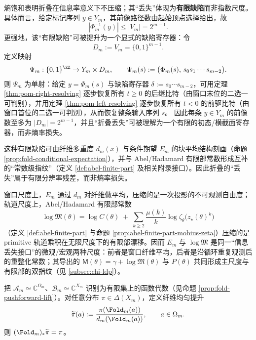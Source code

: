 \begin{remark}\label{rem:pom-finite-defect}
熵饱和表明折叠在信息率意义下不压缩；其“丢失”体现为\textbf{有限缺陷}而非指数尺度。具体而言，给定标记序列 $y\in Y_m$，其前像路径数由起始顶点选择给出，故
\[
|\Phi_m^{-1}(y)|\le |V_m|=2^{m-1}.
\]
更强地，该“有限缺陷”可被提升为一个显式的缺陷寄存器：令
\[
D_m:=V_m=\{0,1\}^{m-1}.
\]
定义映射
\[
\Psi_m:\{0,1\}^{\ZZ}\to Y_m\times D_m,\qquad
\Psi_m(s):=\bigl(\Phi_m(s),\,s_0s_1\cdots s_{m-2}\bigr).
\]
则 $\Psi_m$ 为单射：给定 $y=\Phi_m(s)$ 与缺陷寄存器 $\delta:=s_0\cdots s_{m-2}$，可用定理 \ref{thm:pom-right-resolving} 逐步恢复所有 $t\ge 0$ 的后继比特（由窗口末位的二选一可判别），并用定理 \ref{thm:pom-left-resolving} 逐步恢复所有 $t<0$ 的前驱比特（由窗口首位的二选一可判别），从而恢复整条输入序列 $s$。
因此每条 $y\in Y_m$ 的前像数至多为 $|D_m|=2^{m-1}$，并且“折叠丢失”可被理解为一个有限的初态/横截面寄存器，而非熵率损失。

这种有限缺陷可由纤维多重度 $d_m(x)$ 与条件期望 $E_m$ 的块平均结构刻画（命题 \ref{prop:fold-conditional-expectation}），并与 Abel/Hadamard 有限部常数形成互补的“常数级指纹”（定义 \ref{def:abel-finite-part} 及相关附录接口）。因此折叠的“丢失”属于有限分辨率残差，而非熵率损失。
\end{remark}

\begin{remark}[纤维平均与有限部常数的同一接口]\label{rem:pom-em-logm}
窗口尺度上，$E_m$ 通过 $d_m$ 对纤维做平均，压缩的是一次投影的不可观测自由度；轨道尺度上，Abel/Hadamard 有限部常数
\[
\log\mathfrak{M}(\theta)
=
\log C(\theta)
\;+\;
\sum_{k\ge 2}\frac{\mu(k)}{k}\log\zeta_\theta\!\bigl(z_\star(\theta)^k\bigr)
\]
（定义 \ref{def:abel-finite-part} 与命题 \ref{prop:abel-finite-part-mobius-zeta}）压缩的是 primitive 轨道乘积在无限尺度下的有限部漂移。因而 $E_m$ 与 $\log\mathfrak{M}$ 是同一“信息丢失接口”的微观/宏观两种尺度：前者是窗口纤维平均，后者是沿循环重复观测后的重整化常数；其导出的 $\mathsf{M}(\theta)=\gamma+\log\mathfrak{M}(\theta)$ 与 $P(\theta)$ 共同形成主尺度与有限部的双指纹（见 \ref{subsec:chi-ldp}）。
\end{remark}

\begin{definition}[推前与纤维均匀提升]\label{def:pom-maxent-lift}
把 $\mathcal{A}_m\simeq\mathbb{C}^{\Omega_m}$、$\mathcal{B}_m\simeq\mathbb{C}^{X_m}$ 识别为有限集上的函数代数（见命题 \ref{prop:fold-pushforward-lift}）。对任意分布 $\pi\in\Delta(X_m)$，定义纤维均匀提升
\[
\widetilde\pi(a):=\frac{\pi(\Fold_m(a))}{d_m(\Fold_m(a))},\qquad a\in\Omega_m.
\]
则 $(\Fold_m)_*\widetilde\pi=\pi$。
\end{definition}

